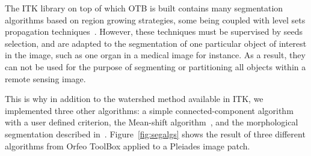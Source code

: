 \documentclass{josis}
\begin{document}
The ITK library on top of which OTB is built contains many
segmentation algorithms based on region growing strategies, some being
coupled with level sets propagation
techniques~\cite{otbSoftwareGuide}. However, these techniques must be
supervised by seeds selection, and are adapted to the segmentation of
one particular object of interest in the image, such as one organ in a
medical image for instance. As a result, they can not be used for the
purpose of segmenting or partitioning all objects within a remote
sensing image.

This is why in addition to the watershed method available in ITK, we
implemented three other algorithms: a simple connected-component algorithm with
a user defined criterion, the Mean-shift algorithm~\cite{comaniciu2002mean}, and
the morphological segmentation described
in~\cite{pesaresi2001new}. Figure~\ref{fig:segalgs} shows the result of three
different algorithms from Orfeo ToolBox applied to a Pleiades image patch.
\end{document}

